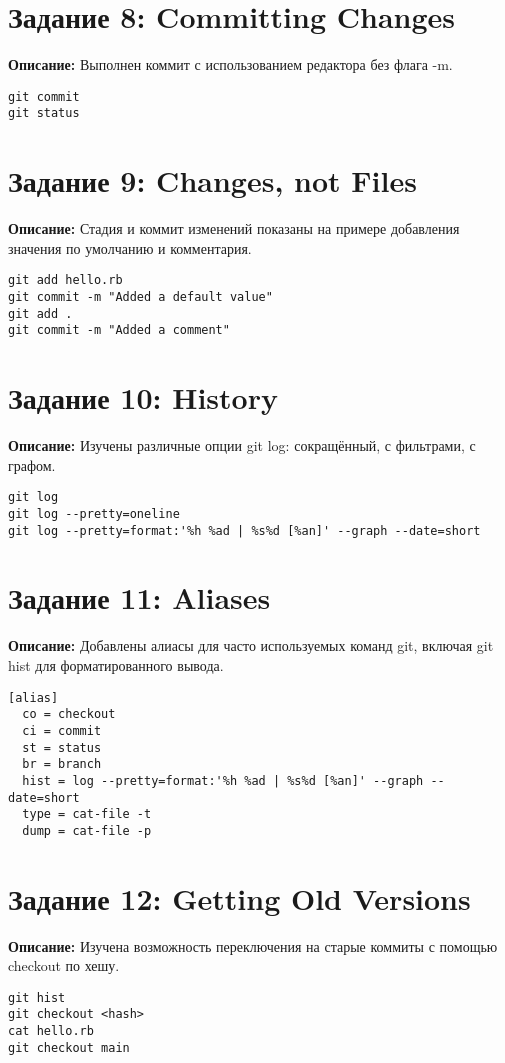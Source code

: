 \documentclass[a4paper,12pt]{report}
\begin{document}
\section*{Задание 8: Committing Changes}
\textbf{Описание:} Выполнен коммит с использованием редактора без флага -m.
\begin{verbatim}
git commit
git status
\end{verbatim}

\section*{Задание 9: Changes, not Files}
\textbf{Описание:} Стадия и коммит изменений показаны на примере добавления значения по умолчанию и комментария.
\begin{verbatim}
git add hello.rb
git commit -m "Added a default value"
git add .
git commit -m "Added a comment"
\end{verbatim}

\section*{Задание 10: History}
\textbf{Описание:} Изучены различные опции git log: сокращённый, с фильтрами, с графом.
\begin{verbatim}
git log
git log --pretty=oneline
git log --pretty=format:'%h %ad | %s%d [%an]' --graph --date=short
\end{verbatim}

\section*{Задание 11: Aliases}
\textbf{Описание:} Добавлены алиасы для часто используемых команд git, включая git hist для форматированного вывода.
\begin{verbatim}
[alias]
  co = checkout
  ci = commit
  st = status
  br = branch
  hist = log --pretty=format:'%h %ad | %s%d [%an]' --graph --date=short
  type = cat-file -t
  dump = cat-file -p
\end{verbatim}

\section*{Задание 12: Getting Old Versions}
\textbf{Описание:} Изучена возможность переключения на старые коммиты с помощью checkout по хешу.
\begin{verbatim}
git hist
git checkout <hash>
cat hello.rb
git checkout main
\end{verbatim}
\end{document}
